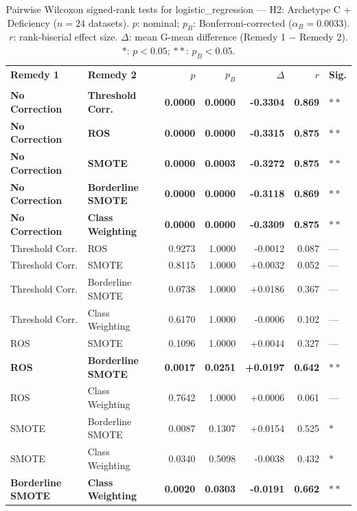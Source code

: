 \begin{table}[ht]
\centering
\scriptsize
\caption{Pairwise Wilcoxon signed-rank tests for logistic_regression --- H2: Archetype C + Deficiency ($n=24$ datasets). $p$: nominal; $p_B$: Bonferroni-corrected ($\alpha_B=0.0033$). $r$: rank-biserial effect size. $\Delta$: mean G-mean difference (Remedy 1 $-$ Remedy 2). $\ast$: $p<0.05$; $\ast\ast$: $p_B<0.05$.}
\label{tab:wilcoxon_logistic_regression_h2}
\begin{tabular}{llrrrrl}
\toprule
\textbf{Remedy 1} & \textbf{Remedy 2} & \textbf{$p$} & \textbf{$p_B$} & \textbf{$\Delta$} & \textbf{$r$} & \textbf{Sig.} \\\\
\midrule
    \textbf{No Correction} & \textbf{Threshold Corr.} & \textbf{0.0000} & \textbf{0.0000} & \textbf{-0.3304} & \textbf{0.869} & $\ast\ast$ \\
    \textbf{No Correction} & \textbf{ROS} & \textbf{0.0000} & \textbf{0.0000} & \textbf{-0.3315} & \textbf{0.875} & $\ast\ast$ \\
    \textbf{No Correction} & \textbf{SMOTE} & \textbf{0.0000} & \textbf{0.0003} & \textbf{-0.3272} & \textbf{0.875} & $\ast\ast$ \\
    \textbf{No Correction} & \textbf{Borderline SMOTE} & \textbf{0.0000} & \textbf{0.0000} & \textbf{-0.3118} & \textbf{0.869} & $\ast\ast$ \\
    \textbf{No Correction} & \textbf{Class Weighting} & \textbf{0.0000} & \textbf{0.0000} & \textbf{-0.3309} & \textbf{0.875} & $\ast\ast$ \\
    Threshold Corr. & ROS & 0.9273 & 1.0000 & -0.0012 & 0.087 & --- \\
    Threshold Corr. & SMOTE & 0.8115 & 1.0000 & +0.0032 & 0.052 & --- \\
    Threshold Corr. & Borderline SMOTE & 0.0738 & 1.0000 & +0.0186 & 0.367 & --- \\
    Threshold Corr. & Class Weighting & 0.6170 & 1.0000 & -0.0006 & 0.102 & --- \\
    ROS & SMOTE & 0.1096 & 1.0000 & +0.0044 & 0.327 & --- \\
    \textbf{ROS} & \textbf{Borderline SMOTE} & \textbf{0.0017} & \textbf{0.0251} & \textbf{+0.0197} & \textbf{0.642} & $\ast\ast$ \\
    ROS & Class Weighting & 0.7642 & 1.0000 & +0.0006 & 0.061 & --- \\
    SMOTE & Borderline SMOTE & 0.0087 & 0.1307 & +0.0154 & 0.525 & $\ast$ \\
    SMOTE & Class Weighting & 0.0340 & 0.5098 & -0.0038 & 0.432 & $\ast$ \\
    \textbf{Borderline SMOTE} & \textbf{Class Weighting} & \textbf{0.0020} & \textbf{0.0303} & \textbf{-0.0191} & \textbf{0.662} & $\ast\ast$ \\
\bottomrule
\end{tabular}
\end{table}
